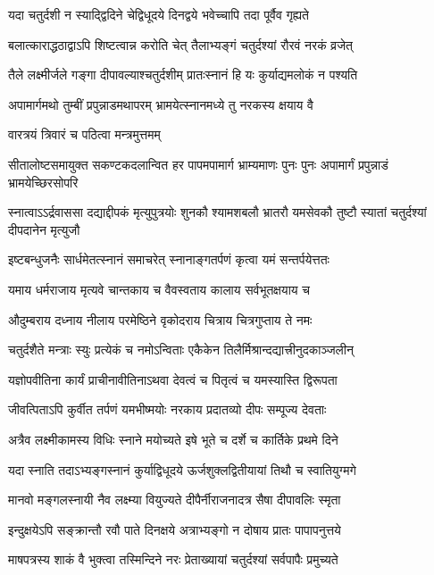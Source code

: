 \twolineshloka
{यदा चतुर्दशी न स्याद्द्विदिने चेद्विधूदये}
{दिनद्वये भवेच्चापि तदा पूर्वैव गृह्यते} %

\twolineshloka
{बलात्काराद्धठाद्वाऽपि शिष्टत्वान्न करोति चेत्}
{तैलाभ्यङ्गं चतुर्दश्यां रौरवं नरकं व्रजेत्} %

\twolineshloka
{तैले लक्ष्मीर्जले गङ्गा दीपावल्याश्चतुर्दशीम्}
{प्रातःस्नानं हि यः कुर्याद्यमलोकं न पश्यति} %

\twolineshloka
{अपामार्गमथो तुम्बीं प्रपुन्नाडमथापरम्}
{भ्रामयेत्स्नानमध्ये तु नरकस्य क्षयाय वै} %


\onelineshloka
{वारत्रयं त्रिवारं च पठित्वा मन्त्रमुत्तमम्} %

\threelineshloka
{सीतालोष्टसमायुक्त सकण्टकदलान्वित}
{हर पापमपामार्ग भ्राम्यमाणः पुनः पुनः}
{अपामार्गं प्रपुन्नाडं भ्रामयेच्छिरसोपरि} %

\threelineshloka
{स्नात्वाऽऽर्द्रवाससा दद्याद्दीपकं मृत्युपुत्रयोः}
{शुनकौ श्यामशबलौ भ्रातरौ यमसेवकौ}
{तुष्टौ स्यातां चतुर्दश्यां दीपदानेन मृत्युजौ} %

\twolineshloka
{इष्टबन्धुजनैः सार्धमेतत्स्नानं समाचरेत्}
{स्नानाङ्गतर्पणं कृत्वा यमं सन्तर्पयेत्ततः} %

\twolineshloka
{यमाय धर्मराजाय मृत्यवे चान्तकाय च}
{वैवस्वताय कालाय सर्वभूतक्षयाय च} %

\twolineshloka
{औदुम्बराय दध्नाय नीलाय परमेष्ठिने}
{वृकोदराय चित्राय चित्रगुप्ताय ते नमः} %

\twolineshloka
{चतुर्दशैते मन्त्राः स्युः प्रत्येकं च नमोऽन्विताः}
{एकैकेन तिलैर्मिश्रान्दद्यात्त्रीनुदकाञ्जलीन्} %

\twolineshloka
{यज्ञोपवीतिना कार्यं प्राचीनावीतिनाऽथवा}
{देवत्वं च पितृत्वं च यमस्यास्ति द्विरूपता} %

\twolineshloka
{जीवत्पिताऽपि कुर्वीत तर्पणं यमभीष्मयोः}
{नरकाय प्रदातव्यो दीपः सम्पूज्य देवताः} %

\twolineshloka
{अत्रैव लक्ष्मीकामस्य विधिः स्नाने मयोच्यते}
{इषे भूते च दर्शे च कार्तिके प्रथमे दिने} %


\twolineshloka
{यदा स्नाति तदाऽभ्यङ्गस्नानं कुर्याद्विधूदये}
{ऊर्जशुक्लद्वितीयायां तिथौ च स्वातियुग्मगे} %

\twolineshloka
{मानवो मङ्गलस्नायी नैव लक्ष्म्या वियुज्यते}
{दीपैर्नीराजनादत्र सैषा दीपावलिः स्मृता} %

\twolineshloka
{इन्दुक्षयेऽपि सङ्क्रान्तौ रवौ पाते दिनक्षये}
{अत्राभ्यङ्गो न दोषाय प्रातः पापापनुत्तये} %

\twolineshloka
{माषपत्रस्य शाकं वै भुक्त्वा तस्मिन्दिने नरः}
{प्रेताख्यायां चतुर्दश्यां सर्वपापैः प्रमुच्यते} %

